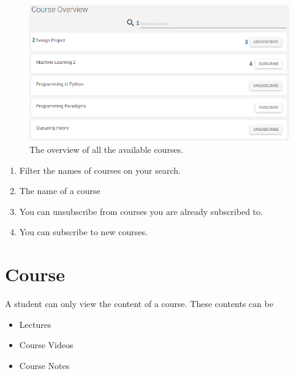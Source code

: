 \documentclass[a4paper,11pt]{report}
\begin{document}
\begin{figure}[H]
\centering
\includegraphics[scale=0.5]{imgs/stu_course_overview.png}
\caption{The overview of all the available courses.}
\label{fig:stu_course_overview}
\end{figure}
\begin{enumerate}
\item Filter the names of courses on your search.
\item The name of a course
\item You can unsubscribe from courses you are already subscribed to.
\item You can subscribe to new courses.
\end{enumerate}


\section{Course}
\label{stu:course}
A student can only view the content of a course. These contents can be \begin{itemize}
\item Lectures
\item Course Videos
\item Course Notes
\end{itemize}
\end{document}
